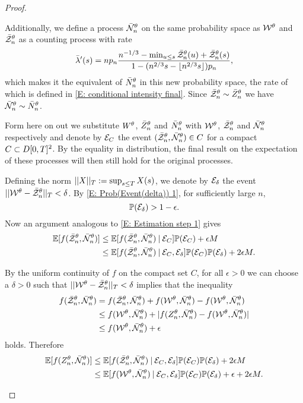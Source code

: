 \begin{proof}
\begin{proofpart}
Additionally, we define a process $\bar{\mathcal{N}}_n^{\theta}$ on the same probability space as $\mathcal{W}^{\theta}$ and $\bar{\mathcal{Z}}^{\theta}_n$ as a counting process with rate
\begin{equation}
\bar{\lambda}'(s) = n p_n \frac{n^{-1 / 3} - \min_{u \leq s} \bar{\mathcal{Z}}^{\theta}_n(u) + \bar{\mathcal{Z}}^{\theta}_n(s)}{1 - (n^{2 / 3}s - \lfloor n^{2 / 3}s\rfloor)p_n},
\end{equation}
which makes it the equivalent of $\bar{N}_n^{\theta}$ in this new probability space, the rate of which is defined in \eqref{E: conditional intensity final}.
Since $\bar{\mathcal{Z}}^{\theta}_n \sim \bar{Z}^{\theta}_n$ we have $\bar{\mathcal{N}}_n^{\theta} \sim \bar{N}_n^{\theta}$.

Form here on out we substitute $W^{\theta}$, $\bar{Z}^{\theta}_n$ and $\bar{N}_n^{\theta}$ with $\mathcal{W}^{\theta}$, $\bar{\mathcal{Z}}^{\theta}_n$ and $\bar{\mathcal{N}}_n^{\theta}$ respectively
and denote by $\mathcal{E}_{C}$ the event $(\bar{\mathcal{Z}}^{\theta}_n, \bar{\mathcal{N}}_n^{\theta}) \in C$ for a compact $C \subset D[0, T]^2$.
By the equality in distribution, the final result on the expectation of these processes will then still hold for the original processes.

Defining the norm $||X||_T := \sup_{s \leq T}X(s)$, we denote by $\mathcal{E}_{\delta}$ the event $||\mathcal{W}^{\theta} - \bar{\mathcal{Z}}^{\theta}_n||_T < \delta$.
By \eqref{E: Prob(Event(delta)) 1}, for sufficiently large $n$, 
\begin{equation} \label{E: Prob Event delta}
\mathbb{P}(\mathcal{E}_{\delta}) > 1 - \epsilon.
\end{equation}
Now an argument analogous to \eqref{E: Estimation step 1} gives
\begin{equation} \label{E: Estimation step 2}
\begin{aligned}
\mathbb{E}[f(\bar{\mathcal{Z}}^{\theta}_n, \bar{\mathcal{N}}_n^{\theta}) ] 
&\leq \mathbb{E}[f(\bar{\mathcal{Z}}^{\theta}_n, \bar{\mathcal{N}}_n^{\theta}) \: | \: \mathcal{E}_{C}]\mathbb{P}(\mathcal{E}_{C}) + \epsilon M \\
&\leq \mathbb{E}[f(\bar{\mathcal{Z}}^{\theta}_n, \bar{\mathcal{N}}_n^{\theta}) \: | \: \mathcal{E}_{C}, \mathcal{E}_{\delta}]\mathbb{P}(\mathcal{E}_{C})\mathbb{P}(\mathcal{E}_{\delta}) + 2 \epsilon M.
\end{aligned}
\end{equation}

By the uniform continuity of $f$ on the compact set $C$, for all $\epsilon>0$ we can choose a $\delta > 0$ such that $||\mathcal{W}^{\theta} - \bar{\mathcal{Z}}^{\theta}_n||_T < \delta$ implies
that the inequality
\begin{equation*}
\begin{aligned}
f(\bar{\mathcal{Z}}^{\theta}_n, \bar{\mathcal{N}}_n^{\theta}) &= f(\bar{\mathcal{Z}}^{\theta}_n, \bar{\mathcal{N}}_n^{\theta}) + f(\mathcal{W}^{\theta}, \bar{\mathcal{N}}_n^{\theta}) - f(\mathcal{W}^{\theta}, \bar{\mathcal{N}}_n^{\theta}) \\
&\leq f(\mathcal{W}^{\theta}, \bar{\mathcal{N}}_n^{\theta}) + |f(Z_n^{\theta}, \bar{\mathcal{N}}_n^{\theta}) - f(\mathcal{W}^{\theta}, \bar{\mathcal{N}}_n^{\theta})| \\
&\leq f(\mathcal{W}^{\theta}, \bar{\mathcal{N}}_n^{\theta}) + \epsilon
\end{aligned}
\end{equation*}
holds. Therefore
\begin{equation} \label{E: Estimation step 3}
\begin{aligned}
\mathbb{E}[f(Z_n^{\theta}, \bar{\mathcal{N}}_n^{\theta}) ] 
&\leq \mathbb{E}[f(\bar{\mathcal{Z}}^{\theta}_n, \bar{\mathcal{N}}_n^{\theta}) \: | \: \mathcal{E}_{C}, \mathcal{E}_{\delta}]\mathbb{P}(\mathcal{E}_{C})\mathbb{P}(\mathcal{E}_{\delta}) + 2 \epsilon M \\
&\leq \mathbb{E}[f(\mathcal{W}^{\theta}, \bar{\mathcal{N}}_n^{\theta}) \: | \: \mathcal{E}_{C}, \mathcal{E}_{\delta}]\mathbb{P}(\mathcal{E}_{C})\mathbb{P}(\mathcal{E}_{\delta}) + \epsilon + 2 \epsilon M.
\end{aligned}
\end{equation}
\end{proofpart}




\end{proof}
